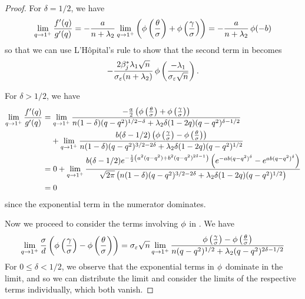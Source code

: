 \begin{proof}
  For \(\delta = 1/2\), we have
  \[
    \lim_{q \rightarrow 1^+} \frac{f'(q)}{g'(q)} = -\frac{a}{n + \lambda_2} \lim_{q \rightarrow 1^+}\left(\operatorname{\phi}\left(\frac{\theta}{\sigma}\right) + \operatorname{\phi}\left(\frac{\gamma}{\sigma}\right)\right) = -\frac{a}{n + \lambda_2} \operatorname{\phi}(-b)
  \]
  so that we can use L'Hôpital's rule to show that the second term in  becomes
  \begin{equation}
    \label{eq:eval-qlimit-stdcase}
    -\frac{2\beta_j^*\lambda_1\sqrt{n}}{\sigma_\varepsilon(n + \lambda_2)} \operatorname{\phi}\left(\frac{-\lambda_1}{\sigma_\varepsilon\sqrt{n}}\right).
  \end{equation}

  For \(\delta > 1/2\), we have
  \[
    \begin{aligned}
      \lim_{q \rightarrow 1^+} \frac{f'(q)}{g'(q)} & = \lim_{q \rightarrow 1^+} \frac{-\frac{a}{2}\left(\pdf\left(\frac{\theta}{\sigma}\right) + \pdf\left(\frac{\gamma}{\sigma}\right)\right)}{n(1-\delta)(q - q^2)^{1/2 - \delta} + \lambda_2 \delta(1 - 2q)(q - q^2)^{\delta - 1/2}}                                                       \\
                                                   & \phantom{= {}} + \lim_{q \rightarrow 1^+} \frac{b(\delta - 1/2)\left(\pdf\left(\frac{\gamma}{\sigma}\right) - \pdf\left(\frac{\theta}{\sigma}\right)\right)}{n(1 - \delta)(q - q^2)^{3/2 - 2\delta} + \lambda_2 \delta (1 - 2q)(q - q^2)^{1/2}}                                          \\
                                                   & = 0 + \lim_{q \rightarrow 1^+} \frac{b(\delta - 1/2) e^{-\frac{1}{2}\left(a^2(q - q^2) + b^2(q - q^2)^{2\delta - 1}\right)}\left(e^{-ab(q-q^2)^\delta} - e^{ab(q-q^2)^\delta}\right)}{\sqrt{2\pi}\left(n(1-\delta)(q - q^2)^{3/2 - 2\delta} + \lambda_2\delta(1-2q)(q-q^2)^{1/2}\right)} \\
                                                   & = 0
    \end{aligned}
  \]
  since the exponential term in the numerator dominates.

  Now we proceed to consider the terms involving \(\operatorname{\phi}\) in . We have
  \begin{equation}
    \label{eq:eval-qlimit-pdfterm}
    \lim_{q \rightarrow 1^+} \frac{\sigma}{d} \left(\operatorname{\phi} \left(\frac{\gamma}{\sigma}\right) - \operatorname{\phi} \left(\frac{\theta}{\sigma}\right)\right)
    = \sigma_\varepsilon \sqrt{n} \lim_{q \rightarrow 1^+} \frac{ \operatorname{\phi}\left(\frac{\gamma}{\sigma}\right) - \operatorname{\phi}\left(\frac{\theta}{\sigma}\right)}{n(q-q^2)^{1/2} + \lambda_2(q - q^2)^{2\delta - 1/2}}
  \end{equation}
  For \(0 \leq \delta < 1/2\), we observe that the exponential terms in \(\operatorname{\phi}\) dominate in the limit, and so we can distribute the limit and consider the limits of the respective terms individually, which both vanish.


\end{proof}
